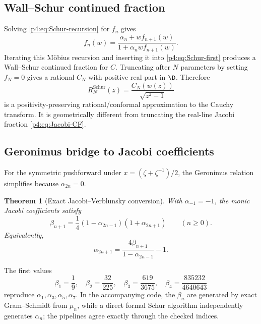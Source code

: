 \documentclass[11pt,oneside]{article}
\newtheorem{theorem}{Theorem}[section]
\theoremstyle{definition}
\begin{document}
\subsection{Wall--Schur continued fraction}

Solving \eqref{p4:eq:Schur-recursion} for \(f_n\) gives
\begin{equation}
 f_n(w)=\frac{\alpha_n+w f_{n+1}(w)}{1+\alpha_n w f_{n+1}(w)}.
 \label{p4:eq:inverse-Schur-step}
\end{equation}
Iterating this Möbius recursion and inserting it into \eqref{p4:eq:Schur-first} produces a
Wall--Schur continued fraction for \(C\). Truncating after \(N\) parameters by setting
\(f_N=0\) gives a rational \(C_N\) with positive real part in \(\D\). Therefore
\begin{equation}
 R_N^{\mathrm{Schur}}(z)=\frac{C_N(w(z))}{\sqrt{z^2-1}}
 \label{p4:eq:R-Schur-approximant}
\end{equation}
is a positivity-preserving rational/conformal approximation to the Cauchy transform. It is
geometrically different from truncating the real-line Jacobi fraction
\eqref{p4:eq:Jacobi-CF}.

\subsection{Geronimus bridge to Jacobi coefficients}

For the symmetric pushforward under \(x=(\zeta+\zeta^{-1})/2\), the Geronimus relation
simplifies because \(\alpha_{2n}=0\).

\begin{theorem}[Exact Jacobi--Verblunsky conversion]
\label{p4:thm:Geronimus}
With \(\alpha_{-1}=-1\), the monic Jacobi coefficients satisfy
\begin{equation}
 \boxed{\displaystyle
 \beta_{n+1}=\frac14(1-\alpha_{2n-1})(1+\alpha_{2n+1})}
 \qquad(n\ge0).
 \label{p4:eq:Geronimus}
\end{equation}
Equivalently,
\begin{equation}
 \alpha_{2n+1}=\frac{4\beta_{n+1}}{1-\alpha_{2n-1}}-1.
 \label{p4:eq:alpha-from-beta}
\end{equation}
\end{theorem}

The first values
\begin{equation}
 \beta_1=\frac19,\quad
 \beta_2=\frac{32}{225},\quad
 \beta_3=\frac{619}{3675},\quad
 \beta_4=\frac{835232}{4640643}
 \label{p4:eq:first-betas}
\end{equation}
reproduce \(\alpha_1,\alpha_3,\alpha_5,\alpha_7\). In the accompanying code, the
\(\beta_n\) are generated by exact Gram--Schmidt from \(\mu_n\), while a direct formal Schur
algorithm independently generates \(\alpha_n\); the pipelines agree exactly through the
checked indices.
\end{document}
